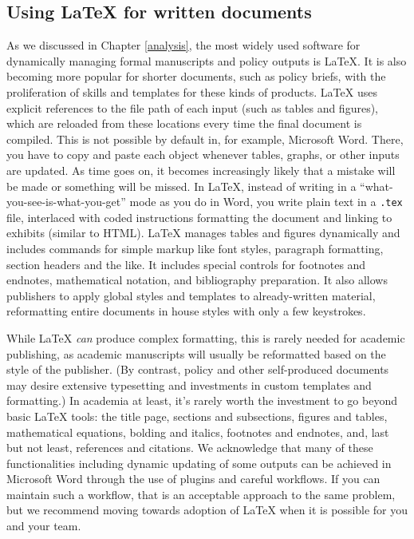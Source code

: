 \documentclass[
]{book}
\begin{document}
\hypertarget{using-latex-for-written-documents}{%
\subsection*{Using LaTeX for written documents}\label{using-latex-for-written-documents}}

As we discussed in Chapter \ref{analysis}, the most widely used software
for dynamically managing formal manuscripts and policy outputs is LaTeX.
It is also becoming more popular for shorter documents,
such as policy briefs,
with the proliferation of skills and templates for these kinds of products.
LaTeX uses explicit references to the file path of each input (such as tables and figures),
which are reloaded from these locations every time the final document is compiled.
This is not possible by default in, for example, Microsoft Word.
There, you have to copy and paste each object
whenever tables, graphs, or other inputs are updated.
As time goes on, it becomes increasingly likely
that a mistake will be made or something will be missed.
In LaTeX, instead of writing in a
``what-you-see-is-what-you-get'' mode as you do in Word,
you write plain text in a \texttt{.tex} file,
interlaced with coded instructions formatting the document and linking to exhibits (similar to HTML).
LaTeX manages tables and figures dynamically
and includes commands for simple markup
like font styles, paragraph formatting, section headers and the like.
It includes special controls for
footnotes and endnotes, mathematical notation, and bibliography preparation.
It also allows publishers to apply global styles and templates to already-written material,
reformatting entire documents in house styles with only a few keystrokes.

While LaTeX \emph{can} produce complex formatting,
this is rarely needed for academic publishing,
as academic manuscripts will usually be reformatted
based on the style of the publisher.
(By contrast, policy and other self-produced documents may desire
extensive typesetting and investments in custom templates and formatting.)
In academia at least,
it's rarely worth the investment to go beyond basic LaTeX tools:
the title page, sections and subsections,
figures and tables, mathematical equations,
bolding and italics, footnotes and endnotes,
and, last but not least, references and citations.
We acknowledge that many of these functionalities
including dynamic updating of some outputs
can be achieved in Microsoft Word
through the use of plugins and careful workflows.
If you can maintain such a workflow,
that is an acceptable approach to the same problem,
but we recommend moving towards adoption of LaTeX
when it is possible for you and your team.
\end{document}
